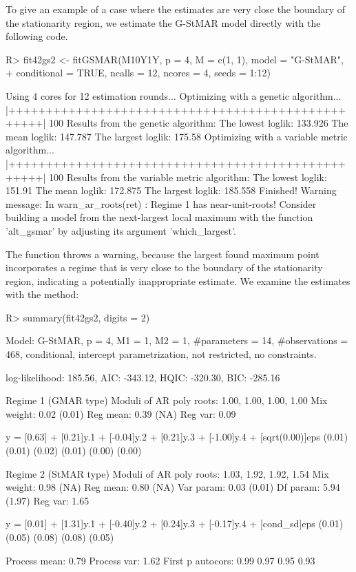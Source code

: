 \documentclass[nojss]{jss} %
\begin{document}
To give an example of a case where the estimates are very close the boundary of the stationarity region, we estimate the G-StMAR model directly with the following code.
%
\begin{CodeChunk}
\begin{CodeInput}
R> fit42gs2 <- fitGSMAR(M10Y1Y, p = 4, M = c(1, 1), model = "G-StMAR",
+    conditional = TRUE, ncalls = 12, ncores = 4, seeds = 1:12)
\end{CodeInput}
\begin{CodeOutput}
Using 4 cores for 12 estimation rounds...
Optimizing with a genetic algorithm...
  |++++++++++++++++++++++++++++++++++++++++++++++++++| 100%
Results from the genetic algorithm:
The lowest loglik:  133.926
The mean loglik:    147.787
The largest loglik: 175.58
Optimizing with a variable metric algorithm...
  |++++++++++++++++++++++++++++++++++++++++++++++++++| 100%
Results from the variable metric algorithm:
The lowest loglik:  151.91
The mean loglik:    172.875
The largest loglik: 185.558
Finished!
Warning message:
In warn_ar_roots(ret) :
  Regime 1 has near-unit-roots! Consider building a model from the
  next-largest local maximum with the function 'alt_gsmar' by adjusting
  its argument 'which_largest'.
\end{CodeOutput}
\end{CodeChunk}
%
The function throws a warning, because the largest found maximum point incorporates a regime that is very close to the boundary of the stationarity region, indicating a potentially inappropriate estimate. We examine the estimates with the  method:
%
\begin{CodeChunk}
\begin{CodeInput}
R> summary(fit42gs2, digits = 2)
\end{CodeInput}
\begin{CodeOutput}
Model:
 G-StMAR, p = 4, M1 = 1, M2 = 1, #parameters = 14, #observations = 468,
 conditional, intercept parametrization, not restricted, no constraints.

 log-likelihood: 185.56, AIC: -343.12, HQIC: -320.30, BIC: -285.16

Regime 1 (GMAR type)
Moduli of AR poly roots: 1.00, 1.00, 1.00, 1.00
Mix weight: 0.02 (0.01)
Reg mean: 0.39 (NA)
Reg var:  0.09

y = [0.63] + [0.21]y.1 + [-0.04]y.2 + [0.21]y.3 + [-1.00]y.4 + [sqrt(0.00)]eps
    (0.01)   (0.01)       (0.02)      (0.01)       (0.00)           (0.00)

Regime 2 (StMAR type)
Moduli of AR poly roots: 1.03, 1.92, 1.92, 1.54
Mix weight: 0.98 (NA)
Reg mean: 0.80 (NA)
Var param: 0.03 (0.01)
Df param: 5.94 (1.97)
Reg var:  1.65

y = [0.01] + [1.31]y.1 + [-0.40]y.2 + [0.24]y.3 + [-0.17]y.4 + [cond_sd]eps
    (0.01)   (0.05)       (0.08)      (0.08)       (0.05)

Process mean: 0.79
Process var:  1.62
First p autocors: 0.99 0.97 0.95 0.93
\end{CodeOutput}
\end{CodeChunk}
\end{document}
